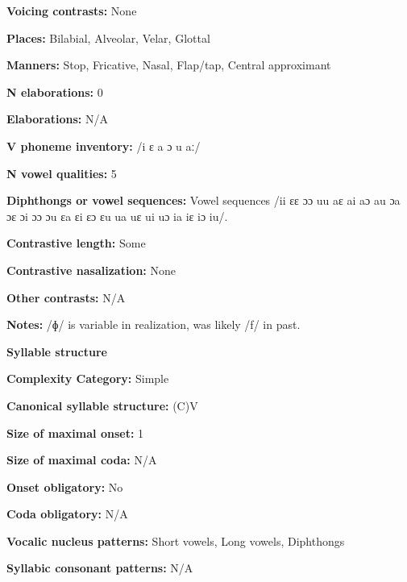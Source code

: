 \textbf{Voicing contrasts:} None



\textbf{Places:} Bilabial, Alveolar, Velar, Glottal



\textbf{Manners:} Stop, Fricative, Nasal, Flap/tap, Central approximant



\textbf{N elaborations:} 0



\textbf{Elaborations:} N/A



\textbf{V phoneme inventory:} /i ɛ a ɔ u aː/



\textbf{N vowel qualities:} 5



\textbf{Diphthongs or vowel sequences:} Vowel sequences /ii ɛɛ ɔɔ uu aɛ ai aɔ au ɔa ɔɛ ɔi ɔɔ ɔu ɛa ɛi ɛɔ ɛu ua uɛ ui uɔ ia iɛ iɔ iu/.



\textbf{Contrastive length:} Some



\textbf{Contrastive nasalization:} None



\textbf{Other contrasts:} N/A



\textbf{Notes:} /ɸ/ is variable in realization, was likely /f/ in past.



\textbf{Syllable structure}



\textbf{Complexity Category:} Simple



\textbf{Canonical syllable structure:} (C)V \citep[533-8]{Bauer1999}



\textbf{Size of maximal onset:} 1



\textbf{Size of maximal coda:} N/A



\textbf{Onset obligatory:} No



\textbf{Coda obligatory:} N/A



\textbf{Vocalic nucleus patterns:} Short vowels, Long vowels, Diphthongs



\textbf{Syllabic consonant patterns:} N/A




